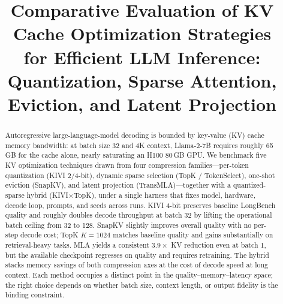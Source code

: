 \documentclass[conference]{IEEEtran}
\begin{document}
\title{Comparative Evaluation of KV Cache Optimization Strategies\\
for Efficient LLM Inference: Quantization, Sparse Attention,\\
Eviction, and Latent Projection}

\author{%
}

\maketitle

\begin{abstract}
Autoregressive large-language-model decoding is bounded by key-value
(KV) cache memory bandwidth: at batch size 32 and 4K context,
Llama-2-7B requires roughly 65\,GB for the cache alone, nearly
saturating an H100 80\,GB GPU.  We benchmark five KV optimization
techniques drawn from four compression families---per-token
quantization (KIVI 2/4-bit), dynamic sparse selection (TopK /
TokenSelect), one-shot eviction (SnapKV), and latent projection
(TransMLA)---together with a quantized-sparse hybrid (KIVI$\times$TopK),
under a single harness that fixes model, hardware, decode loop, prompts,
and seeds across runs.  KIVI 4-bit preserves baseline LongBench quality
and roughly doubles decode throughput at batch 32 by lifting the
operational batch ceiling from 32 to 128.  SnapKV slightly improves
overall quality with no per-step decode cost; TopK $K\!=\!1024$ matches
baseline quality and gains substantially on retrieval-heavy tasks.  MLA
yields a consistent $3.9\times$ KV reduction even at batch 1, but the
available checkpoint regresses on quality and requires retraining.  The
hybrid stacks memory savings of both compression axes at the cost of
decode speed at long context.  Each method occupies a distinct point in
the quality--memory--latency space; the right choice depends on whether
batch size, context length, or output fidelity is the binding
constraint.
\end{abstract}
\end{document}
